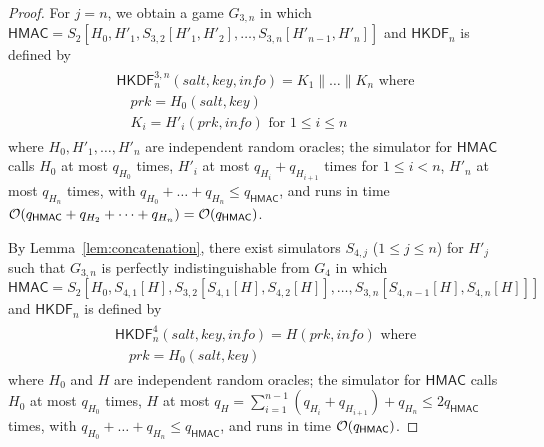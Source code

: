 \documentclass[compsoc, conference, letterpaper, 10pt, times]{IEEEtran}
\newcommand{\HKDF}{\mathsf{HKDF}}
\newcommand{\salt}{\mathit{salt}}
\newcommand{\key}{\mathit{key}}
\newcommand{\info}{\mathit{info}}
\newcommand{\prk}{\mathit{prk}}
\newcommand{\hmac}{\mathsf{HMAC}}
\newcommand{\ab}{\allowbreak}
\begin{document}
\begin{proof}
For $j=n$, we obtain a game $G_{3,n}$  in which
$\hmac = S_2[H_0, H'_1, S_{3,2}[H'_1, H'_2], \dots, S_{3,n}[H'_{n-1}, H'_{n}]]$ and $\HKDF_n$ is defined by
\begin{align*}
\begin{split}
&\HKDF^{3,n}_n(\salt,\key,\info) = K_1 \| \dots \| K_n \text{ where}\\
&\quad \prk = H_0(\salt,\key)\\
&\quad K_i = H'_i(\prk, \info )\text{ for }1 \leq i \leq n
\end{split}
\end{align*}
where $H_0, H'_1, \dots, H'_{n}$ are independent random oracles;
the simulator for $\hmac$ calls 
$H_0$ at most $q_{H_0}$ times,
$H'_i$ at most $q_{H_i} + q_{H_{i+1}}$ times for $1 \leq i < n$,
$H'_{n}$ at most $q_{H_{n}}$ times, with
$q_{H_0} + \dots + q_{H_n} \leq q_{\hmac}$, and runs in time 
${\cal O}(q_{\hmac} + q_{H_2} + \dots + q_{H_{n}}) = {\cal O}(q_{\hmac})$.

By Lemma~\ref{lem:concatenation}, there exist simulators $S_{4,j}$ ($1 \leq j \leq n$) for $H'_j$ such that $G_{3,n}$ is perfectly indistinguishable
from $G_4$ in which
$\hmac = S_2[H_0, \ab S_{4,1}[H], \ab S_{3,2}[S_{4,1}[H], S_{4,2}[H]], \ab \dots, \ab S_{3,n}[S_{4,n-1}[H], S_{4,n}[H]]]$ and $\HKDF_n$ is defined by
\begin{align*}
\begin{split}
&\HKDF^4_n(\salt,\key,\info) = H(\prk, \info) \text{ where}\\
&\quad \prk = H_0(\salt,\key)
\end{split}
\end{align*}
where $H_0$ and $H$ are independent random oracles;
the simulator for $\hmac$ calls 
$H_0$ at most $q_{H_0}$ times,
$H$ at most $q_H = \sum_{i = 1}^{n-1} (q_{H_i} + q_{H_{i+1}}) + q_{H_n} \leq 2 q_{\hmac}$ times,
with $q_{H_0} + \dots + q_{H_n} \leq q_{\hmac}$, and runs in time 
${\cal O}(q_{\hmac})$.


\end{proof}
\end{document}
